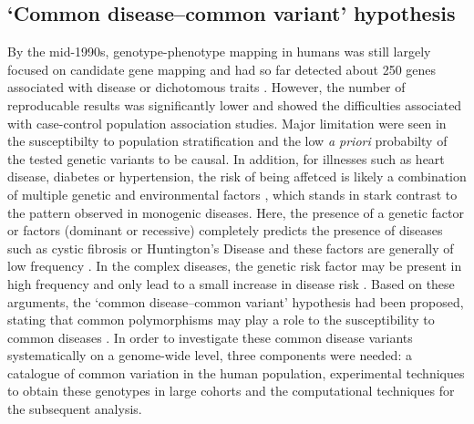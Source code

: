 \subsection{`Common disease–common variant' hypothesis}
By the mid-1990s, genotype-phenotype mapping in humans was still largely focused on candidate gene mapping and had so far detected about 250 genes associated with disease or dichotomous traits \citep{Hirschhorn2002}. However, the number of reproducable results was significantly lower and showed the difficulties associated with case-control population association studies. Major limitation were seen in the susceptibilty to population stratification \citep{Lohmuller2003} and the low \textit{a priori} probabilty of the tested genetic variants to be causal. In addition, for illnesses such as heart disease, diabetes or hypertension, the risk of being affetced is likely a combination of multiple genetic and environmental factors \citep{Hunter2005}, which stands in stark contrast to the pattern observed in monogenic diseases. Here, the presence of a genetic factor or factors (dominant or recessive) completely predicts the presence of diseases such as cystic fibrosis or Huntington's Disease and these factors are generally of low frequency \citep{Sankaranarayanan1998}.  In the complex diseases, the genetic risk factor may be present in high frequency and only lead to a small increase in disease risk \citep{Reich2001}. Based on these arguments, the `common disease–common variant' hypothesis had been proposed, stating that common polymorphisms may play a role to the susceptibility to common diseases \citep{Risch1996,Lander1996,Chakravarti1999,Reich2001}. In order to  investigate these common disease variants systematically on a genome-wide level, three components were needed: a catalogue of common variation in the human population, experimental techniques to obtain these genotypes in large cohorts and the computational techniques for the subsequent analysis.

